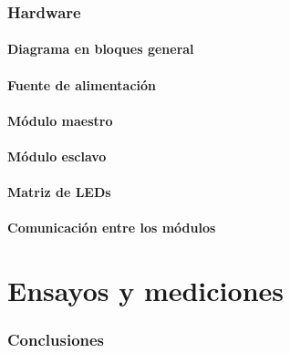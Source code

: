 \section{Hardware}
\subsection{Diagrama en bloques general}
\subsection{Fuente de alimentación}
\subsection{Módulo maestro}
\subsection{Módulo esclavo}
\subsection{Matriz de LEDs}
\subsection{Comunicación entre los módulos}

\clearpage
\part{Ensayos y mediciones}\label{part:ensayos}
\section{Conclusiones}
